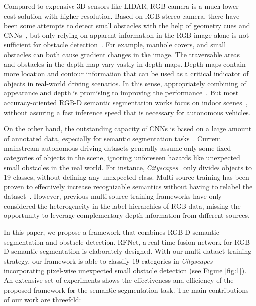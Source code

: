 \documentclass[letterpaper, 10 pt, journal, twoside]{ieeetran}
\begin{document}
Compared to expensive 3D sensors like LIDAR, RGB camera is a much lower cost solution with higher resolution. Based on RGB stereo camera, there have been some attempts to detect small obstacles with the help of geometry cues and CNNs~\cite{pinggera2016lost}, but only relying on apparent information in the RGB image alone is not sufficient for obstacle detection~\cite{gupta2018mergenet}. For example, manhole covers, and small obstacles can both cause gradient changes in the image. The traversable areas and obstacles in the depth map vary vastly in depth maps. Depth maps contain more location and contour information that can be used as a critical indicator of objects in real-world driving scenarios. In this sense, appropriately combining of appearance and depth is promising to improving the performance~\cite{gupta2018mergenet}\cite{hu2019acnet}\cite{ramos2017detecting}. But most accuracy-oriented RGB-D semantic segmentation works focus on indoor scenes~\cite{hu2019acnet}\cite{hazirbas2016fusenet}\cite{jiang2018rednet}, without assuring a fast inference speed that is necessary for autonomous vehicles.

On the other hand, the outstanding capacity of CNNs is based on a large amount of annotated data, especially for semantic segmentation tasks~\cite{sun2019see}. Current mainstream autonomous driving datasets generally assume only some fixed categories of objects in the scene, ignoring unforeseen hazards like unexpected small obstacles in the real world. For instance, \textit{Cityscapes}~\cite{Cordts2016Cityscapes} only divides objects to 19 classes, without defining any unexpected class. Multi-source training has been proven to effectively increase recognizable semantics without having to relabel the dataset~\cite{meletis2018training}. However, previous multi-source training frameworks have only considered the heterogeneity in the label hierarchies of RGB data, missing the opportunity to leverage complementary depth information from different sources.

In this paper, we propose a framework that combines RGB-D semantic segmentation and obstacle detection. RFNet, a real-time fusion network for RGB-D semantic segmentation is elaborately designed. With our multi-dataset training strategy, our framework is able to classify 19 categories in \textit{Cityscapes} incorporating pixel-wise unexpected small obstacle detection (see Figure \ref{fig:1}). An extensive set of experiments shows the effectiveness and efficiency of the proposed framework for the semantic segmentation task. The main contributions of our work are threefold:
\end{document}
